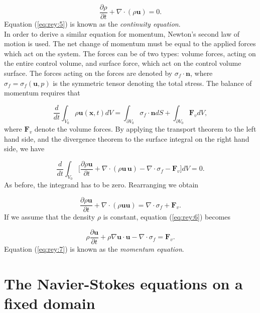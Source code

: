 \documentclass[a4paper,11pt,oneside]{book}
\begin{document}
\begin{equation}
\label{eq:rey:5}
\frac{\partial \rho}{\partial t	} + \nabla \cdot (\rho \mathbf{u}) = 0.
\end{equation}
Equation (\ref{eq:rey:5}) is known as the \emph{continuity equation}. \\

In order to derive a similar equation for momentum, Newton's second law of motion is used. The net change of momentum must be equal to the applied forces which act on the system. The forces can be of two types: volume forces, acting on the entire control volume, and surface force, which act on the control volume surface. The forces acting on the forces are denoted by $\sigma_f \cdot \mathbf{n}$, where $\sigma_f = \sigma_f (\mathbf{u}, p)$ is the symmetric tensor denoting the total stress. The balance of momentum requires that

\begin{equation}
\frac{d}{dt} \int_{V_0} \rho \mathbf{u} (\mathbf{x}, t) dV =
\int_{\partial V_0} \sigma_f \cdot \mathbf{n} dS + \int_{\partial V_0} \mathbf{F}_v dV,
\end{equation}
where $\mathbf{F}_v$ denote the volume forces. By applying the transport theorem to the left hand side, and the divergence theorem to the surface integral on the right hand side, we have

\begin{equation}
\frac{d}{dt} \int_{V_0} \Big[ \frac{\partial \rho \mathbf{u}}{\partial t} + \nabla \cdot (\rho \mathbf{u \, u}) - \nabla \cdot \sigma_f - \mathbf{F}_v \Big] dV = 0.
\end{equation}
As before, the integrand has to be zero. Rearranging we obtain 

\begin{equation}
\label{eq:rey:6}
\frac{\partial \rho \mathbf{u}}{\partial t} + \nabla \cdot (\rho \mathbf{u} \mathbf{u}) = 
\nabla \cdot \sigma_f + \mathbf{F}_v.
\end{equation}
If we assume that the density $\rho$ is constant, equation (\ref{eq:rey:6}) becomes

\begin{equation}
\label{eq:rey:7}
\rho \frac{\partial \mathbf{u}}{\partial t} + \rho \nabla \mathbf{u} \cdot \mathbf{u} - \nabla \cdot \sigma_f = \mathbf{F}_v.
\end{equation}
Equation (\ref{eq:rey:7}) is known as the \emph{momentum equation}.


\section{The Navier-Stokes equations on a fixed domain}
\end{document}
